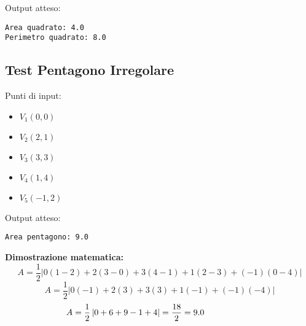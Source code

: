 \documentclass{article}
\begin{document}
\begin{multicols}{2}
Output atteso:
\begin{verbatim}
Area quadrato: 4.0
Perimetro quadrato: 8.0
\end{verbatim}

\subsection{Test Pentagono Irregolare}
Punti di input:
\begin{itemize}
\item \( V_1(0, 0) \)
\item \( V_2(2, 1) \)
\item \( V_3(3, 3) \)
\item \( V_4(1, 4) \)
\item \( V_5(-1, 2) \)
\end{itemize}

Output atteso:
\begin{verbatim}
Area pentagono: 9.0
\end{verbatim}

\noindent\textbf{Dimostrazione matematica:}
\[
A = \frac{1}{2} \left|
0(1-2) + 2(3-0) + 3(4-1) + 1(2-3) + (-1)(0-4)
\right|
\]
\[
A = \frac{1}{2} \left|
0(-1) + 2(3) + 3(3) + 1(-1) + (-1)(-4)
\right|
\]
\[
\hspace{-2cm} A = \frac{1}{2} \left| 0 + 6 + 9 - 1 + 4 \right| = \frac{18}{2} = 9.0
\]

\end{multicols}
\end{document}
